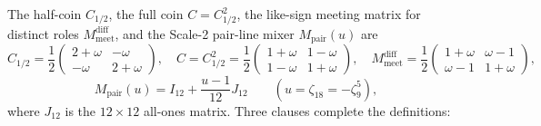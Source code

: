 The half-coin $C_{1/2}$, the full coin $C = C_{1/2}^2$, the like-sign
meeting matrix for distinct roles $M_{\mathrm{meet}}^{\mathrm{diff}}$, and the Scale-2 pair-line mixer
$M_{\mathrm{pair}}(u)$ are
\begin{equation}
C_{1/2} = \frac{1}{2}\begin{pmatrix} 2 + \omega & -\omega \\ -\omega & 2 + \omega \end{pmatrix},
\quad
C = C_{1/2}^2 = \frac{1}{2}\begin{pmatrix} 1 + \omega & 1 - \omega \\ 1 - \omega & 1 + \omega \end{pmatrix},
\quad
M_{\mathrm{meet}}^{\mathrm{diff}} = \frac{1}{2}\begin{pmatrix} 1 + \omega & \omega - 1 \\ \omega - 1 & 1 + \omega \end{pmatrix},
\label{eq:coin}
\end{equation}
\begin{equation}
M_{\mathrm{pair}}(u) = I_{12} + \frac{u - 1}{12} J_{12} \qquad (u = \zeta_{18} = -\zeta_9^5),
\label{eq:mpair}
\end{equation}
where $J_{12}$ is the $12 \times 12$ all-ones matrix. Three clauses complete the definitions:

